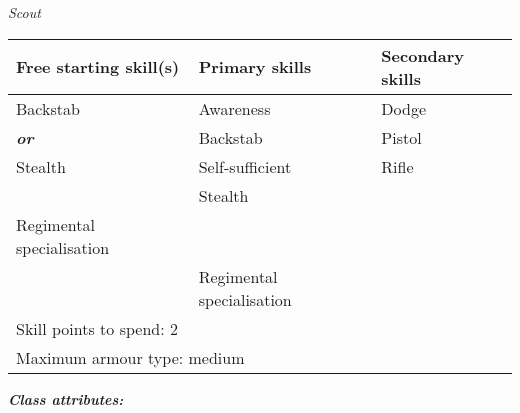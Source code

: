 \documentclass{scrbook}
\begin{document}
\textit{Scout}

\begin{table}
\begin{tabular}{|l|l|l|} \hline 
Free starting skill(s) & Primary skills & Secondary skills \\
 \hline Backstab & Awareness & Dodge \\
 \hline \textbf{\textit{or}} & Backstab & Pistol \\
 \hline Stealth & Self-sufficient & Rifle \\
 \hline  & Stealth &  \\
 \hline Regimental specialisation &  &  \\
 \hline  & Regimental specialisation &  \\
 \hline \multicolumn{3}{|l|}{Skill points to spend: 2} \\
 \hline \multicolumn{3}{|l|}{Maximum armour type: medium} \\
 \hline \end{tabular}

\end{table}

\textbf{\textit{Class attributes:}}
\end{document}
